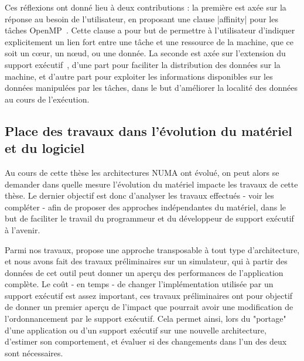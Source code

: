 Ces réflexions ont donné lieu à deux contributions : la première est axée sur la réponse au besoin de l'utilisateur, en proposant une clause |affinity| pour les tâches OpenMP~\cite{Virouleau2016b}.
Cette clause a pour but de permettre à l'utilisateur d'indiquer explicitement un lien fort entre une tâche et une ressource de la machine, que ce soit un cœur, un nœud, ou une donnée.
La seconde est axée sur l'extension du support exécutif~\cite{Virouleau2016a}, d'une part pour faciliter la distribution des données sur la machine, et d'autre part pour exploiter les informations disponibles sur les données manipulées par les tâches, dans le but d'améliorer la localité des données au cours de l'exécution.


\subsection*{Place des travaux dans l'évolution du matériel et du logiciel}

Au cours de cette thèse les architectures NUMA ont évolué, on peut alors se demander dans quelle mesure l'évolution du matériel impacte les travaux de cette thèse.
Le dernier objectif est donc d'analyser les travaux effectués - voir les compléter - afin de proposer des approches indépendantes du matériel, dans le but de faciliter le travail du programmeur et du développeur de support exécutif à l'avenir.

Parmi nos travaux, \outil propose une approche transposable à tout type d'architecture, et nous avons fait des travaux préliminaires sur un simulateur, qui à partir des données de cet outil peut donner un aperçu des performances de l'application complète.
Le coût - en temps - de changer l'implémentation utilisée par un support exécutif est assez important, ces travaux préliminaires ont pour objectif de donner un premier aperçu de l'impact que pourrait avoir une modification de l'ordonnancement par le support exécutif.
Cela permet ainsi, lors du "portage" d'une application ou d'un support exécutif sur une nouvelle architecture, d'estimer son comportement, et évaluer si des changements dans l'un des deux sont nécessaires.
